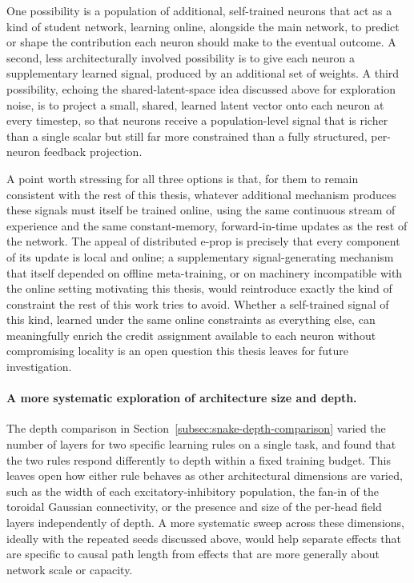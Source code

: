 One possibility is a population of additional, self-trained neurons that
act as a kind of student network, learning online, alongside the main
network, to predict or shape the contribution each neuron should make to
the eventual outcome. A second, less architecturally
involved possibility is to give each neuron a supplementary learned
signal, produced by an additional set of
weights. A third possibility, echoing
the shared-latent-space idea discussed above for exploration noise, is to
project a small, shared, learned latent vector onto each neuron at every
timestep, so that neurons receive a population-level signal that is
richer than a single scalar but still far more constrained than a fully
structured, per-neuron feedback projection.

A point worth stressing for all three options is that, for them to remain
consistent with the rest of this thesis, whatever additional mechanism
produces these signals must itself be trained online, using the same
continuous stream of experience and the same constant-memory,
forward-in-time updates as the rest of the network. The appeal of distributed
e-prop is precisely that every component of its update is local and
online; a supplementary signal-generating mechanism that itself depended
on offline meta-training, or on machinery incompatible with the
online setting motivating this thesis, would reintroduce exactly the
kind of constraint the rest of this work tries to avoid. Whether a
self-trained signal of this kind, learned under the same online
constraints as everything else, can meaningfully enrich the credit
assignment available to each neuron without compromising locality is an
open question this thesis leaves for future investigation.

\paragraph{A more systematic exploration of architecture size and depth.}
The depth comparison in Section~\ref{subsec:snake-depth-comparison} varied the
number of layers for two specific learning rules on a single task, and
found that the two rules respond differently to depth within a fixed
training budget. This leaves open how either rule behaves as other
architectural dimensions are varied, such as the width of each
excitatory-inhibitory population, the fan-in of the toroidal Gaussian
connectivity, or the presence and size of the per-head field layers
independently of depth. A more systematic sweep across these dimensions,
ideally with the repeated seeds discussed above, would help separate
effects that are specific to causal path length from effects that are
more generally about network scale or capacity.

